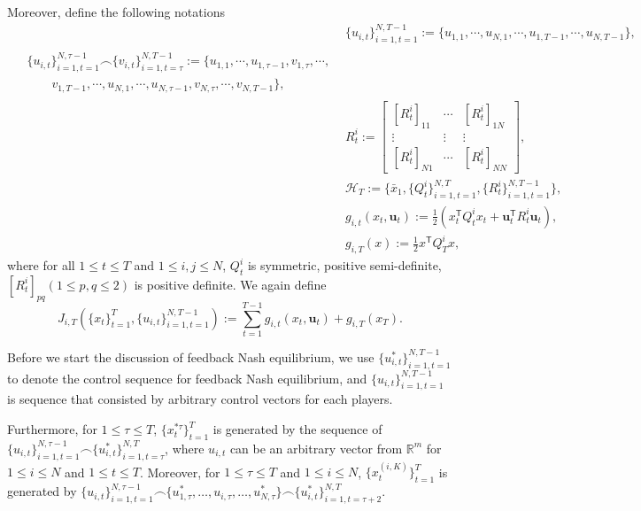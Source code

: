 \documentclass{article}
\newcommand{\transpose}{\mathsf{T}}
\begin{document}
Moreover, define the following notations
\begin{align}
    &\{u_{i,t}\}_{i=1,t=1}^{N,T-1} := \{u_{1,1},\cdots,u_{N,1},\cdots, u_{1,T-1},\cdots,u_{N,T-1}\},\\
    \begin{split}
         &\{u_{i,t}\}_{i=1,t=1}^{N,\tau-1} \frown \{v_{i,t}\}_{i=1,t=\tau}^{N,T-1}:=\{u_{1,1},\cdots,u_{1,\tau-1},v_{1,\tau},\cdots,\\
    &\qquad v_{1,T-1},\cdots,u_{N,1},\cdots,u_{N,\tau-1},v_{N,\tau},\cdots,v_{N,T-1} \},
    \end{split}
   \\ 
   & R_{t}^{i} := 
   \begin{bmatrix}
       [R_{t}^{i}]_{11} & \cdots & [R_{t}^{i}]_{1N}\\
       \vdots & \vdots & \vdots\\
       [R_{t}^{i}]_{N1} & \cdots & [R_{t}^{i}]_{NN}
   \end{bmatrix},\\
    \label{eq:history}
    &\mathcal{H}_{T} := \{ \bar{x}_{1},\{Q_{t}^{i}\}_{i=1,t=1}^{N,T},\{R_{t}^{i}\}_{i=1,t=1}^{N,T-1}\},\\
    &g_{i,t}(x_{t}, \mathbf{u}_{t}) := \frac{1}{2}(x_{t}^{\mathsf{T}}Q_{t}^{i}x_{t} + 
    \mathbf{u}_{t}^{\transpose}R_{t}^{i}\mathbf{u}_{t}),\\
    &g_{i,T}(x) := \frac{1}{2} x^{\mathsf{T}}Q_{T}^{i}x,
\end{align}
where for all $1 \leq t \leq T$ and $1\leq i,j\leq N$, $Q_{t}^{i}$ is symmetric, positive semi-definite, $[R_{t}^{i}]_{pq}(1\leq p,q \leq 2)$ is positive definite. We again define
\begin{equation}
    J_{i,T}(\{x_{t}\}_{t=1}^{T},\{u_{i,t}\}_{i=1,t=1}^{N,T-1}) := \sum_{t=1}^{T-1} g_{i,t}(x_{t}, \mathbf{u}_{t}) + g_{i,T}(x_{T}).
\end{equation}

Before we start the discussion of feedback Nash equilibrium, we use $\{u_{i,t}^{*}\}_{i=1,t=1}^{N,T-1}$ to denote the control sequence for feedback Nash equilibrium, and $\{u_{i,t}\}_{i=1,t=1}^{N,T-1}$ is sequence that consisted by arbitrary control vectors for each players. 

Furthermore, for $1 \leq \tau \leq T$, $\{x_{t}^{*\tau}\}_{t=1}^{T}$ is generated by the sequence of $\{u_{i,t}\}_{i=1,t=1}^{N,\tau-1} \frown \{u_{i,t}^{*}\}_{i=1,t=\tau}^{N,T}$, where $u_{i,t}$ can be an arbitrary vector from $\mathbb{R}^{m}$ for $1 \leq i \leq N$ and $1 \leq t \leq T$. Moreover, for $1 \leq \tau \leq T$ and $1 \leq i \leq N$, $\{x_{t}^{(i,K)}\}_{t=1}^{T}$ is generated by $\{u_{i,t}\}_{i=1,t=1}^{N,\tau-1} \frown \{u_{1,\tau}^{*},\dots, u_{i,\tau},\dots,u_{N,\tau}^{*}\} \frown \{u_{i,t}^{*}\}_{i=1,t=\tau+2}^{N,T}$. 
\end{document}
